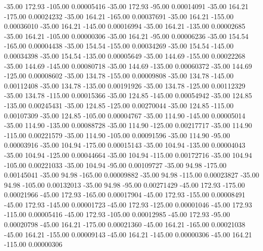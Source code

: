     -35.00    172.93   -105.00     0.00005416
    -35.00    172.93    -95.00     0.00014091
    -35.00    164.21   -175.00     0.00024232
    -35.00    164.21   -165.00     0.00037691
    -35.00    164.21   -155.00     0.00036010
    -35.00    164.21   -145.00     0.00016994
    -35.00    164.21   -135.00     0.00002685
    -35.00    164.21   -105.00     0.00000306
    -35.00    164.21    -95.00     0.00006236
    -35.00    154.54   -165.00     0.00004438
    -35.00    154.54   -155.00     0.00034269
    -35.00    154.54   -145.00     0.00034398
    -35.00    154.54   -135.00     0.00005649
    -35.00    144.69   -155.00     0.00022268
    -35.00    144.69   -145.00     0.00080718
    -35.00    144.69   -135.00     0.00060372
    -35.00    144.69   -125.00     0.00008602
    -35.00    134.78   -155.00     0.00009808
    -35.00    134.78   -145.00     0.00112408
    -35.00    134.78   -135.00     0.00191926
    -35.00    134.78   -125.00     0.00112329
    -35.00    134.78   -115.00     0.00015366
    -35.00    124.85   -145.00     0.00054942
    -35.00    124.85   -135.00     0.00245431
    -35.00    124.85   -125.00     0.00270044
    -35.00    124.85   -115.00     0.00107309
    -35.00    124.85   -105.00     0.00004767
    -35.00    114.90   -145.00     0.00005014
    -35.00    114.90   -135.00     0.00088728
    -35.00    114.90   -125.00     0.00217717
    -35.00    114.90   -115.00     0.00221579
    -35.00    114.90   -105.00     0.00091596
    -35.00    114.90    -95.00     0.00003916
    -35.00    104.94   -175.00     0.00015143
    -35.00    104.94   -135.00     0.00004043
    -35.00    104.94   -125.00     0.00044664
    -35.00    104.94   -115.00     0.00172716
    -35.00    104.94   -105.00     0.00221033
    -35.00    104.94    -95.00     0.00109727
    -35.00     94.98   -175.00     0.00145041
    -35.00     94.98   -165.00     0.00009882
    -35.00     94.98   -115.00     0.00023827
    -35.00     94.98   -105.00     0.00132013
    -35.00     94.98    -95.00     0.00271429
    -45.00    172.93   -175.00     0.00021966
    -45.00    172.93   -165.00     0.00017904
    -45.00    172.93   -155.00     0.00008491
    -45.00    172.93   -145.00     0.00001723
    -45.00    172.93   -125.00     0.00001046
    -45.00    172.93   -115.00     0.00005416
    -45.00    172.93   -105.00     0.00012985
    -45.00    172.93    -95.00     0.00020798
    -45.00    164.21   -175.00     0.00021360
    -45.00    164.21   -165.00     0.00021038
    -45.00    164.21   -155.00     0.00009143
    -45.00    164.21   -145.00     0.00000306
    -45.00    164.21   -115.00     0.00000306
